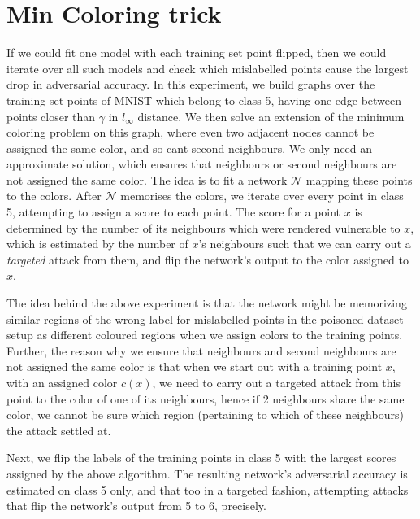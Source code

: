 \documentclass{ociamthesis}
\begin{document}
\section{Min Coloring trick}
If we could fit one model with each training set point flipped, then we could
iterate over all such models and check which mislabelled points cause the
largest drop in adversarial accuracy. In this experiment, we build graphs over
the training set points of MNIST which belong to class 5, having one edge
between points closer than $\gamma$ in $l_\infty$ distance. We then solve an
extension of the minimum coloring problem on this graph, where even two adjacent
nodes cannot be assigned the same color, and so cant second neighbours. We only
need an approximate solution, which ensures that neighbours or second neighbours
are not assigned the same color. The idea is to fit a network $\mathcal{N}$
mapping these points to the colors. After $\mathcal{N}$ memorises the colors, we
iterate over every point in class 5, attempting to assign a score to each point.
The score for a point $x$ is determined by the number of its neighbours which
were rendered vulnerable to $x$, which is estimated by the number of $x$'s
neighbours such that we can carry out a \emph{targeted} attack from them, and
flip the network's output to the color assigned to $x$.

The idea behind the above experiment is that the network might be memorizing
similar regions of the wrong label for mislabelled points in the poisoned
dataset setup as different coloured regions when we assign colors to the
training points. Further, the reason why we ensure that neighbours and second
neighbours are not assigned the same color is that when we start out with a
training point $x$, with an assigned color $c(x)$, we need to carry out a
targeted attack from this point to the color of one of its neighbours, hence if
2 neighbours share the same color, we cannot be sure which region (pertaining to
which of these neighbours) the attack settled at.

Next, we flip the labels of the training points in class 5 with the largest
scores assigned by the above algorithm. The resulting network's adversarial
accuracy is estimated on class 5 only, and that too in a targeted fashion, attempting attacks that flip the network's output from 5 to 6, precisely.
\end{document}
